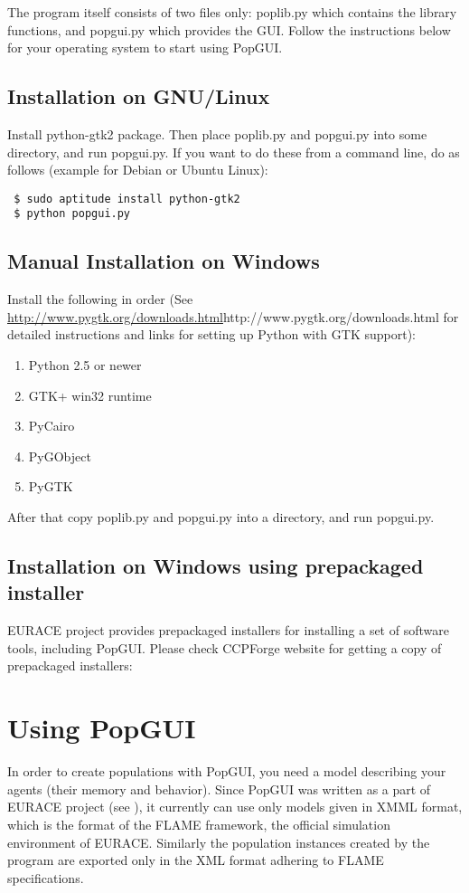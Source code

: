 \documentclass{article}
\begin{document}
The program itself consists of two files only: poplib.py which contains the library functions, and popgui.py which provides the GUI. Follow the instructions below for your operating system to start using PopGUI.

\subsection{Installation on GNU/Linux}
Install python-gtk2 package. Then place poplib.py and popgui.py into some directory, and run popgui.py. If you want to do these from a command line, do as follows (example for Debian or Ubuntu Linux):
\begin{verbatim}
 $ sudo aptitude install python-gtk2
 $ python popgui.py
\end{verbatim}

\subsection{Manual Installation on Windows}
Install the following in order (See \url{http://www.pygtk.org/downloads.html}{http://www.pygtk.org/downloads.html} for detailed instructions and links for setting up Python with GTK support):
\begin{enumerate}
\item Python 2.5 or newer
\item GTK+ win32 runtime
\item PyCairo
\item PyGObject
\item PyGTK
\end{enumerate}

After that copy poplib.py and popgui.py into a directory, and run popgui.py.

\subsection{Installation on Windows using prepackaged installer}
EURACE project provides prepackaged installers for installing a set of software tools, including PopGUI. Please check CCPForge website for getting a copy of prepackaged installers: 
\section{Using PopGUI}
In order to create populations with PopGUI, you need a model describing your agents (their memory and behavior). Since PopGUI was written as a part of EURACE project (see ), it currently can use only  models given in XMML format, which is the format of the FLAME framework, the official simulation environment of EURACE. Similarly the population instances created by the program are exported only in the XML format adhering to FLAME specifications. 
\end{document}
